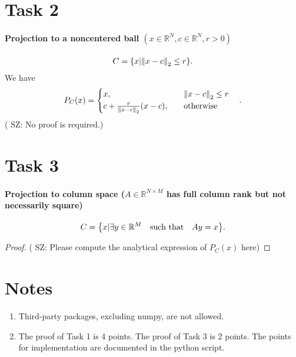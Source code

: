 \documentclass[11pt]{article}
\newcommand{\sz}[1]{({\color{blue} {SZ: #1}})}
\newcommand{\R}{\mathbb{R}}
\begin{document}
\section*{Task 2}
\paragraph*{Projection to a noncentered ball $(x \in \R^N, c \in \R^N, r > 0)$}
\begin{align}
  C = \qty{ x | \norm{x - c}_2 \leq r}.
\end{align}
We have
\begin{align}
  P_C(x) = \begin{cases}
    x, & \qq{$\norm{x-c}_2 \leq r$} \\
    c + \frac{r}{\norm{x - c}_2}(x - c), &\qq{otherwise}
  \end{cases}.
\end{align}
\sz{No proof is required.}

\section*{Task 3}
\paragraph*{Projection to column space ($A \in \R^{N \times M}$ has full column rank but not necessarily square)}
\begin{align}
  C = \qty{ x | \exists y \in \R^M \qq{such that} Ay = x}.
\end{align}
\begin{proof}
\sz{Please compute the analytical expression of $P_C(x)$ here}
\end{proof}

\section*{Notes}
\begin{enumerate}
  \item Third-party packages, excluding numpy, are not allowed.
  \item The proof of Task 1 is 4 points. The proof of Task 3 is 2 points. The points for implementation are documented in the python script.
\end{enumerate}
\end{document}
